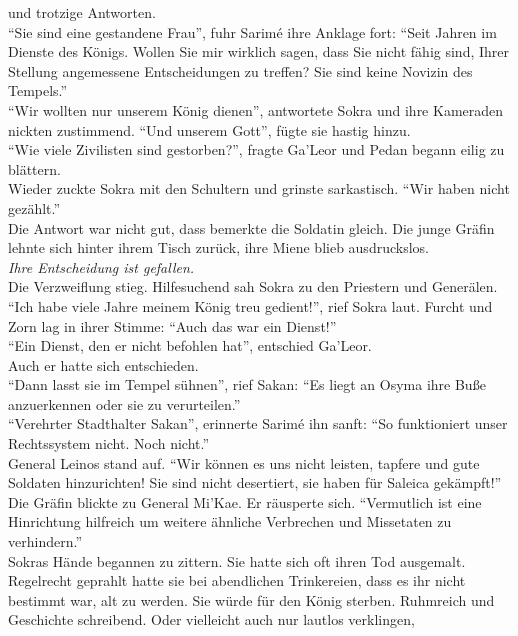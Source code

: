 und trotzige Antworten.\\
``Sie sind eine gestandene Frau'', fuhr Sarimé ihre Anklage fort: ``Seit Jahren im Dienste des 
Königs. Wollen Sie mir wirklich sagen, dass Sie nicht fähig sind, Ihrer Stellung angemessene 
Entscheidungen zu treffen? Sie sind keine Novizin des Tempels.''\\
``Wir wollten nur unserem König dienen'', antwortete Sokra und ihre Kameraden nickten zustimmend. 
``Und unserem Gott'', fügte sie hastig hinzu.\\
``Wie viele Zivilisten sind gestorben?'', fragte Ga'Leor und Pedan begann eilig zu blättern.\\
Wieder zuckte Sokra mit den Schultern und grinste sarkastisch. ``Wir haben nicht gezählt.''\\
Die Antwort war nicht gut, dass bemerkte die Soldatin gleich. Die junge Gräfin lehnte sich hinter 
ihrem Tisch zurück, ihre Miene blieb ausdruckslos.\\
\textit{Ihre Entscheidung ist gefallen.}\\
Die Verzweiflung stieg. Hilfesuchend sah Sokra zu den Priestern und Generälen.\\
``Ich habe viele Jahre meinem König treu gedient!'', rief Sokra laut. Furcht und Zorn lag in ihrer 
Stimme: ``Auch das war ein Dienst!''\\
``Ein Dienst, den er nicht befohlen hat'', entschied Ga'Leor.\\
Auch er hatte sich entschieden.\\
``Dann lasst sie im Tempel sühnen'', rief Sakan: ``Es liegt an Osyma ihre Buße anzuerkennen oder 
sie zu verurteilen.''\\
``Verehrter Stadthalter Sakan'', erinnerte Sarimé ihn sanft: ``So funktioniert unser Rechtssystem 
nicht. Noch nicht.''\\
General Leinos stand auf. ``Wir können es uns nicht leisten, tapfere und gute Soldaten 
hinzurichten! Sie sind nicht desertiert, sie haben für Saleica gekämpft!''\\
Die Gräfin blickte zu General Mi'Kae. Er räusperte sich. ``Vermutlich ist eine Hinrichtung 
hilfreich um weitere ähnliche Verbrechen und Missetaten zu verhindern.''\\
Sokras Hände begannen zu zittern. Sie hatte sich oft ihren Tod ausgemalt. Regelrecht geprahlt hatte 
sie bei abendlichen Trinkereien, dass es ihr nicht bestimmt war, alt zu werden. Sie würde für den 
König sterben. Ruhmreich und Geschichte schreibend. Oder vielleicht auch nur lautlos verklingen, 
